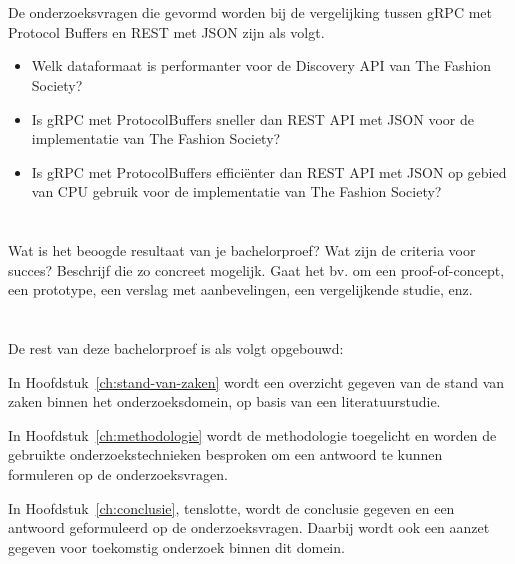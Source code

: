 \section{}
\label{sec:onderzoeksvraag}

De onderzoeksvragen die gevormd worden bij de vergelijking tussen gRPC met Protocol Buffers en REST met JSON zijn als volgt.
\begin{itemize}
    \item Welk dataformaat is performanter voor de Discovery API van The Fashion Society?
    \item Is gRPC met ProtocolBuffers sneller dan REST API met JSON voor de implementatie van The Fashion Society?
    \item Is gRPC met ProtocolBuffers efficiënter dan REST API met JSON op gebied van CPU gebruik voor de implementatie van The Fashion Society?
\end{itemize}

\section{}
\label{sec:onderzoeksdoelstelling}

Wat is het beoogde resultaat van je bachelorproef? Wat zijn de criteria voor succes? Beschrijf die zo concreet mogelijk. Gaat het bv. om een proof-of-concept, een prototype, een verslag met aanbevelingen, een vergelijkende studie, enz.

\section{}
\label{sec:opzet-bachelorproef}


De rest van deze bachelorproef is als volgt opgebouwd:

In Hoofdstuk~\ref{ch:stand-van-zaken} wordt een overzicht gegeven van de stand van zaken binnen het onderzoeksdomein, op basis van een literatuurstudie.

In Hoofdstuk~\ref{ch:methodologie} wordt de methodologie toegelicht en worden de gebruikte onderzoekstechnieken besproken om een antwoord te kunnen formuleren op de onderzoeksvragen.


In Hoofdstuk~\ref{ch:conclusie}, tenslotte, wordt de conclusie gegeven en een antwoord geformuleerd op de onderzoeksvragen. Daarbij wordt ook een aanzet gegeven voor toekomstig onderzoek binnen dit domein.